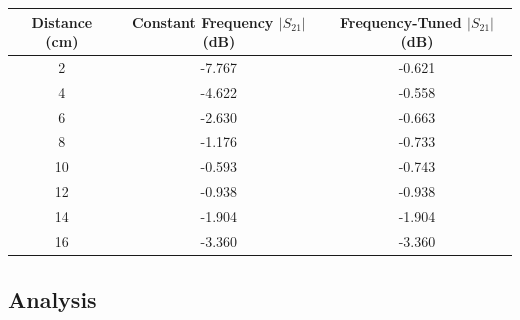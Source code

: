 \documentclass{article}
\begin{document}
\begin{table}[H]
\centering
\begin{tabular}{|c|c|c|}
\hline
Distance (cm) & Constant Frequency $\vert S_{21}\vert$ (dB) 
& Frequency-Tuned $\vert S_{21}\vert$ (dB) \\ \hline
2             & -7.767                          & -0.621                       \\ \hline
4             & -4.622                          & -0.558                       \\ \hline
6             & -2.630                          & -0.663                       \\ \hline
8             & -1.176                          & -0.733                       \\ \hline
10            & -0.593                          & -0.743                       \\ \hline
12            & -0.938                          & -0.938                       \\ \hline
14            & -1.904                          & -1.904                       \\ \hline
16            & -3.360                          & -3.360                       \\ \hline
\end{tabular}
\end{table}

\subsection{Analysis}
\end{document}
